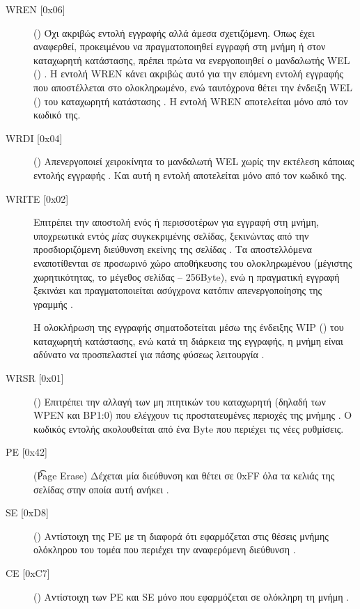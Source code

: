 \begin{description}
    \item[WREN [0x06{]}] () Όχι ακριβώς εντολή εγγραφής αλλά
    άμεσα σχετιζόμενη. Όπως έχει αναφερθεί, προκειμένου να πραγματοποιηθεί
    εγγραφή στη μνήμη ή στον καταχωρητή κατάστασης, πρέπει πρώτα να
    ενεργοποιηθεί ο μανδαλωτής WEL ()
    \parencite[6]{25lc1024}.
    Η εντολή WREN κάνει ακριβώς αυτό για την επόμενη εντολή εγγραφής που
    αποστέλλεται στο ολοκληρωμένο, ενώ ταυτόχρονα θέτει την ένδειξη WEL
    () του καταχωρητή κατάστασης
    \parencite[10]{25lc1024}. Η εντολή WREN αποτελείται μόνο από τον κωδικό της.

    \item[WRDI [0x04{]}] () Απενεργοποιεί χειροκίνητα το
    μανδαλωτή WEL χωρίς την εκτέλεση κάποιας εντολής εγγραφής
    \parencite[9]{25lc1024}. Και αυτή η εντολή αποτελείται μόνο από τον κωδικό
    της.

    \item[WRITE [0x02{]}] Επιτρέπει την αποστολή ενός ή περισσοτέρων 
    για εγγραφή στη μνήμη, υποχρεωτικά εντός \emph{μίας} συγκεκριμένης σελίδας,
    ξεκινώντας από την προσδιοριζόμενη διεύθυνση εκείνης της σελίδας
    \parencite[6,8]{25lc1024}. Τα αποστελλόμενα  εναποτίθενται σε
    προσωρινό χώρο αποθήκευσης του ολοκληρωμένου (μέγιστης χωρητικότητας, το
    μέγεθος σελίδας -- 256Byte), ενώ η πραγματική εγγραφή ξεκινάει και
    πραγματοποιείται ασύγχρονα κατόπιν απενεργοποίησης της γραμμής
     \parencite[6]{25lc1024}.

    Η ολοκλήρωση της εγγραφής σηματοδοτείται μέσω της ένδειξης WIP
    () του καταχωρητή κατάστασης, ενώ κατά τη διάρκεια της
    εγγραφής, η μνήμη είναι αδύνατο να προσπελαστεί για πάσης φύσεως λειτουργία
    \parencite[6]{25lc1024}.

    \item[WRSR [0x01{]}] () Επιτρέπει την αλλαγή των
    μη πτητικών  του καταχωρητή (δηλαδή των  WPEN και BP1:0) που
    ελέγχουν τις προστατευμένες περιοχές της μνήμης
    \parencite[10--11]{25lc1024}. Ο κωδικός εντολής ακολουθείται από ένα Byte
    που περιέχει τις νέες ρυθμίσεις.

    \item[PE [0x42{]}] (\t{Page Erase}) Δέχεται μία διεύθυνση και θέτει σε 0xFF
    όλα τα κελιάς της σελίδας στην οποία αυτή ανήκει \parencite[13]{25lc1024}.

    \item[SE [0xD8{]}] () Αντίστοιχη της PE με τη διαφορά ότι
    εφαρμόζεται στις θέσεις μνήμης ολόκληρου του τομέα που περιέχει την
    αναφερόμενη διεύθυνση \parencite[14]{25lc1024}.

    \item[CE [0xC7{]}] () Αντίστοιχη των PE και SE μόνο που
    εφαρμόζεται σε ολόκληρη τη μνήμη \parencite[15]{25lc1024}.
\end{description}

